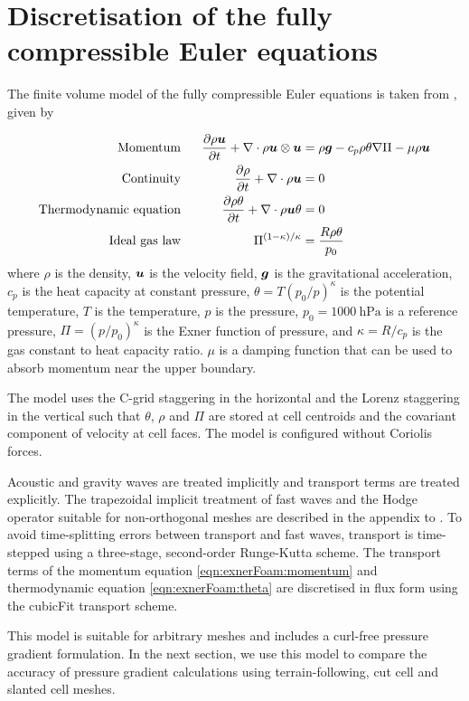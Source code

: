\section{Discretisation of the fully compressible Euler equations}
\label{sec:slanted:exnerFoamH}

The finite volume model of the fully compressible Euler equations is taken from \citet{weller-shahrokhi2014}, given by

\begin{subequations}
\begin{align}
	\text{Momentum} &\ &\  	\frac{\partial \rho \vect{u}}{\partial t} + \nabla \cdot \rho \vect{u}\otimes\vect{u} &= \rho \vect{g} - c_p \rho \theta \nabla \Pi - \mu \rho \vect{u} \label{eqn:exnerFoam:momentum} \\
	\text{Continuity} &\ &\	\frac{\partial \rho}{\partial t} + \nabla \cdot \rho \vect{u} &= 0 \label{eqn:exnerFoam:cont} \\
	\text{Thermodynamic equation} &\ &\ \frac{\partial \rho \theta}{\partial t} + \nabla \cdot \rho \vect{u} \theta &= 0 \label{eqn:exnerFoam:theta} \\
	\text{Ideal gas law} &\ &\ \Pi^{(1 - \kappa)/\kappa} &= \frac{R \rho \theta}{p_0} \label{eqn:exnerFoam:state}
\end{align}
\end{subequations}
where \(\rho\) is the density, \(\bm{u}\) is the velocity field, \(\bm{g}\) is the gravitational acceleration, \(c_p\) is the heat capacity at constant pressure, \(\theta = T \left(p_0/p\right)^\kappa\) is the potential temperature, \(T\) is the temperature, \(p\) is the pressure, \(p_0 = \SI{1000}{\hecto\pascal}\) is a reference pressure, \(\Pi = \left(p / p_0 \right)^\kappa\) is the Exner function of pressure, and \(\kappa = R/c_p\) is the gas constant to heat capacity ratio.  \(\mu\) is a damping function that can be used to absorb momentum near the upper boundary.

The model uses the C-grid staggering in the horizontal and the Lorenz staggering in the vertical such that $\theta$, $\rho$ and $\Pi$ are stored at cell centroids and the covariant component of velocity at cell faces.  The model is configured without Coriolis forces.

Acoustic and gravity waves are treated implicitly and transport terms are treated explicitly.
The trapezoidal implicit treatment of fast waves and the Hodge operator suitable for non-orthogonal meshes are described in the appendix to \citet{shaw-weller2016}.
To avoid time-splitting errors between transport and fast waves, transport is time-stepped using a three-stage, second-order Runge-Kutta scheme.
The transport terms of the momentum equation \eqref{eqn:exnerFoam:momentum} and thermodynamic equation \eqref{eqn:exnerFoam:theta} are discretised in flux form using the cubicFit transport scheme.

This model is suitable for arbitrary meshes and includes a curl-free pressure gradient formulation.
In the next section, we use this model to compare the accuracy of pressure gradient calculations using terrain-following, cut cell and slanted cell meshes.
